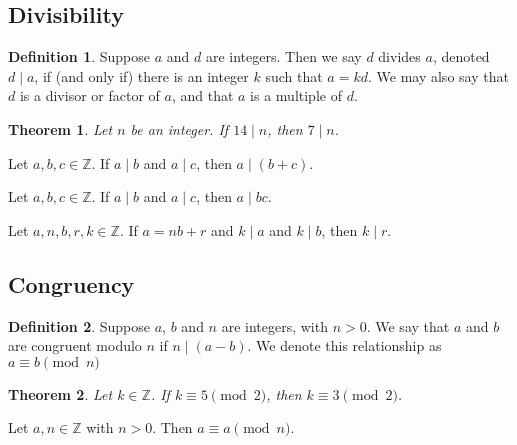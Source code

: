 \documentclass{article}
\newtheorem*{theorem*}{Theorem}
\theoremstyle{definition}
\newtheorem*{definition*}{Definition}
\newenvironment{manualtheorem}[1]{%
  \renewcommand{\thetheorem}{#1}%
  \theorem%
}{%
  \endtheorem%
}
\begin{document}
\subsection{Divisibility}

\begin{definition*}
	Suppose $a$ and $d$ are integers. Then we say $d$ divides $a$, denoted $d \mid a$, if (and only if) there is an integer $k$ such that $a = kd$. We may also say that $d$ is a divisor or factor of $a$, and that $a$ is a multiple of $d$.
\end{definition*}



\begin{theorem*}
	Let $n$ be an integer. If $14 \mid n$, then $7 \mid n$.
\end{theorem*}

\begin{manualtheorem}{1.1}
	Let $a, b, c \in \mathbb{Z}$. If $a \mid b$ and $a \mid c$, then $a \mid (b + c)$.
\end{manualtheorem}

\begin{manualtheorem}{1.3}
	Let $a, b, c \in \mathbb{Z}$. If $a \mid b$ and $a \mid c$, then $a \mid bc$.
\end{manualtheorem}

\begin{manualtheorem}{1.32}
	Let $a, n, b, r, k \in \mathbb{Z}$. If $a = nb + r$ and $k \mid a$ and $k \mid b$, then $k \mid r$.
\end{manualtheorem}


\subsection{Congruency}
\begin{definition*}
	Suppose $a$, $b$ and $n$ are integers, with $n > 0$. We say that $a$ and $b$ are congruent modulo $n$ if $n \mid (a - b)$. We denote this relationship as
	\(a \equiv b \pmod{n}\)
\end{definition*}



\begin{theorem*}
	Let $k \in \mathbb{Z}$. If $k \equiv 5 \pmod{2}$, then $k \equiv 3 \pmod{2}$.
\end{theorem*}

\begin{manualtheorem}{1.9}
	Let $a, n \in \mathbb{Z}$ with $n > 0$. Then $a \equiv a \pmod{n}$.
\end{manualtheorem}
\end{document}
